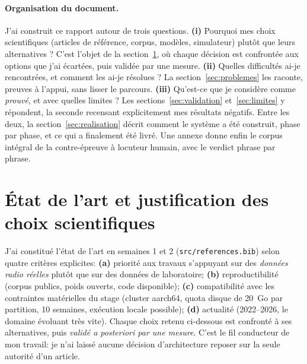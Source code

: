 \documentclass[11pt,a4paper]{article}
\begin{document}
\paragraph{Organisation du document.} J'ai construit ce rapport autour de trois questions. \textbf{(i)} Pourquoi mes choix scientifiques (articles de référence, corpus, modèles, simulateur) plutôt que leurs alternatives ? C'est l'objet de la section~\ref{sec:etat-art}, où chaque décision est confrontée aux options que j'ai écartées, puis validée par une mesure. \textbf{(ii)} Quelles difficultés ai-je rencontrées, et comment les ai-je résolues ? La section~\ref{sec:problemes} les raconte, preuves à l'appui, sans lisser le parcours. \textbf{(iii)} Qu'est-ce que je considère comme \emph{prouvé}, et avec quelles limites ? Les sections~\ref{sec:validation} et~\ref{sec:limites} y répondent, la seconde recensant explicitement mes résultats négatifs. Entre les deux, la section~\ref{sec:realisation} décrit comment le système a été construit, phase par phase, et ce qui a finalement été livré. Une annexe donne enfin le corpus intégral de la contre-épreuve à locuteur humain, avec le verdict phrase par phrase. 

\section{État de l'art et justification des choix scientifiques}
\label{sec:etat-art}

\begin{objbox}
J'ai constitué l'état de l'art en semaines 1 et 2 (\texttt{src/references.bib}) selon quatre critères explicites: \textbf{(a)} priorité aux travaux s'appuyant sur des
\emph{données radio réelles} plutôt que sur des données de laboratoire; \textbf{(b)}
reproductibilité (corpus publics, poids ouverts, code disponible); \textbf{(c)}
compatibilité avec les contraintes matérielles du stage (cluster aarch64, quota disque de
20~Go par partition, 10 semaines, exécution locale possible); \textbf{(d)} actualité
(2022--2026, le domaine évoluant très vite). Chaque choix retenu ci-dessous est confronté à ses alternatives, puis \emph{validé a posteriori par une mesure}. C'est le fil conducteur de mon travail: je n'ai laissé aucune décision d'architecture reposer sur la seule autorité d'un article.
\end{objbox}
\end{document}
